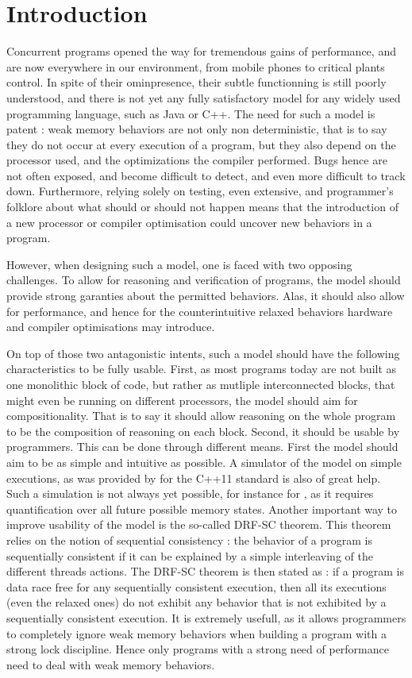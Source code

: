 \documentclass[titlepage,11pt,a4paper]{report}
\theoremstyle{plain}
\begin{document}
\chapter{Introduction}
Concurrent programs opened the way for tremendous gains of performance, and are now everywhere in our environment, from mobile phones to critical plants control. In spite of their ominpresence, their subtle functionning is still poorly understood, and there is not yet any fully satisfactory model for any widely used programming language, such as Java or C++. The need for such a model is patent : weak memory behaviors are not only non deterministic, that is to say they do not occur at every execution of a program, but they also depend on the processor used, and the optimizations the compiler performed. Bugs hence are not often exposed, and become difficult to detect, and even more difficult to track down. Furthermore, relying solely on testing, even extensive, and programmer's folklore about what should or should not happen means that the introduction of a new processor or compiler optimisation could uncover new behaviors in a program.

However, when designing such a model, one is faced with two opposing challenges. To allow for reasoning and verification of programs, the model should provide strong garanties about the permitted behaviors. Alas, it should also allow for performance, and hence for the counterintuitive relaxed behaviors hardware and compiler optimisations may introduce.

On top of those two antagonistic intents, such a model should have the following characteristics to be fully usable. First, as most programs today are not built as one monolithic block of code, but rather as mutliple interconnected blocks, that might even be running on different processors, the model should aim for compositionality\cite{BattyRoyalSoc}. That is to say it should allow reasoning on the whole program to be the composition of reasoning on each block. Second, it should be usable by programmers. This can be done through different means. First the model should aim to be as simple and intuitive as possible. A simulator of the model on simple executions, as was provided by \cite{BOSSW11} for the C++11 standard is also of great help. Such a simulation is not always yet possible, for instance for \cite{KHLVD17}, as it requires quantification over all future possible memory states. Another important way to improve usability of the model is the so-called DRF-SC theorem. This theorem relies on the notion of sequential consistency \cite{LamportSC} : the behavior of a program is sequentially consistent if it can be explained by a simple interleaving of the different threads actions. The DRF-SC theorem is then stated as : if a program is data race free for any sequentially consistent execution, then all its executions (even the relaxed ones) do not exhibit any behavior that is not exhibited by a sequentially consistent execution. It is extremely usefull, as it allows programmers to completely ignore weak memory behaviors when building a program with a strong lock discipline. Hence only programs with a strong need of performance need to deal with weak memory behaviors.
\end{document}
